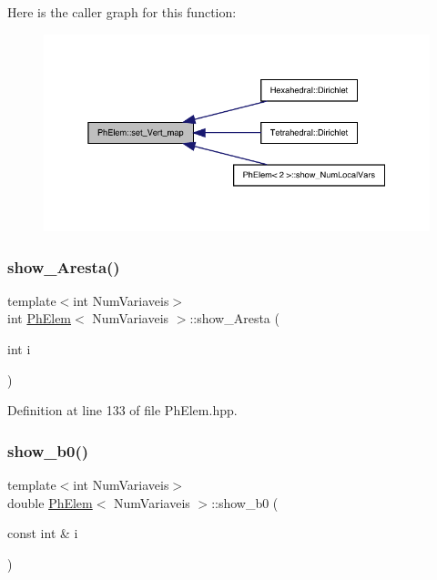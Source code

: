 Here is the caller graph for this function\+:
\nopagebreak
\begin{figure}[H]
\begin{center}
\leavevmode
\includegraphics[width=345pt]{classPhElem_a134cbfd28fc238a24156ab1c24fc31c0_icgraph}
\end{center}
\end{figure}
\mbox{\label{classPhElem_ac6f5e03dd6e155037363dbd0ea2f401b}} 
\subsubsection{\texorpdfstring{show\+\_\+\+Aresta()}{show\_Aresta()}}
{\footnotesize\ttfamily template$<$int Num\+Variaveis$>$ \\
int \hyperlink{classPhElem}{Ph\+Elem}$<$ Num\+Variaveis $>$\+::show\+\_\+\+Aresta (\begin{DoxyParamCaption}\item[{int}]{i }\end{DoxyParamCaption})\hspace{0.3cm}{\ttfamily [inline]}}



Definition at line 133 of file Ph\+Elem.\+hpp.

\mbox{\label{classPhElem_a0caf55d9fac7477102ee34373c67a024}} 
\subsubsection{\texorpdfstring{show\+\_\+b0()}{show\_b0()}\hspace{0.1cm}{\footnotesize\ttfamily [1/2]}}
{\footnotesize\ttfamily template$<$int Num\+Variaveis$>$ \\
double \hyperlink{classPhElem}{Ph\+Elem}$<$ Num\+Variaveis $>$\+::show\+\_\+b0 (\begin{DoxyParamCaption}\item[{const int \&}]{i }\end{DoxyParamCaption})}



